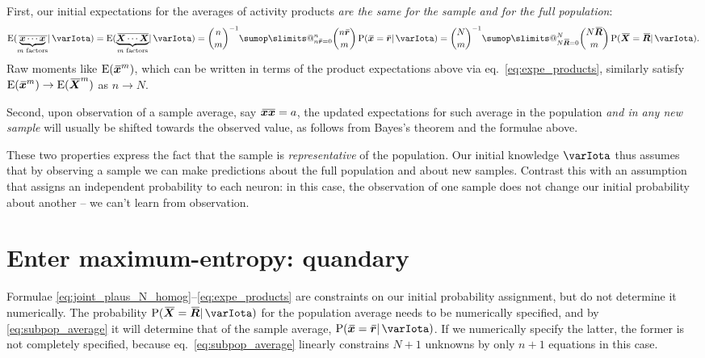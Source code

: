\documentclass{article}
\makeatletter
\theoremstyle{remark}
\theoremstyle{innote}
\def\sum{\DOTSI\sumop\slimits@}
\renewcommand*{\|}{\mathpunct{|}}%
\newcommand*{\p}{\mathrm{P}}%
\newcommand*{\eqn}{eq.}%
\newcommand*{\E}{\mathrm{E}}
\DeclarePairedDelimiter\expp{(}{)}
\newcommand*{\expe}{\E\expp}%
\theoremstyle{simple}
\newcommand*{\widebar}[1]{{\mkern1.5mu\skew{2}\overline{\mkern-1.5mu#1\mkern-1.5mu}\mkern 1.5mu}}
\newcommand*{\av}{\widebar} %
\newcommand*{\sav}{\widebar} %
\newcommand*{\yxx}{x}%
\newcommand*{\yx}{\bm{\yxx}}%
\newcommand*{\yxs}{\sav{\yx}}%
\newcommand*{\yX}{\bm{X}}%
\newcommand*{\yXf}{\av{\yX}}%
\newcommand*{\yxxs}{\sav{\yx\yx}}%
\newcommand*{\yr}{\bm{r}}%
\newcommand*{\yrs}{\sav{\yr}}%
\newcommand*{\yR}{\bm{R}}%
\newcommand*{\yRf}{\av{\yR}}%
\newcommand*{\yH}{\varIota}
\makeatother
\begin{document}
First, our initial expectations for the averages of activity products
\emph{are the same for the sample and for the full population}:
\begin{equation}
  \label{eq:expe_products}
\expe{\sav{\underbrace{\yx \dotsm \yx}_{\text{$m$ factors}}} \| \yH}
=
\expe{\av{\underbrace{\yX \dotsm \yX}_{\text{$m$ factors}}} \| \yH}
=
\binom{n}{m}^{-1}
\sum_{n \yrs=0}^n %
\binom{n \yrs}{m}\, \p(\yxs=\yrs \| \yH)
=
\binom{N}{m}^{-1}
\sum_{N \yRf=0}^N %
\binom{N \yRf}{m}\, \p(\yXf=\yRf \| \yH).
\end{equation}
Raw moments like $\expe{\yxs^m}$, which can be written in terms of the
product expectations above via \eqn~\eqref{eq:expe_products}, similarly
satisfy $\expe{\yxs^m} \to \expe{\yXf^m}$ as $n \to N$.

Second, upon observation of a sample average, say $\yxxs=a$, the updated
expectations for such average in the population \emph{and in any new
  sample} will usually be shifted towards the observed value, as follows
from Bayes's theorem and the formulae above.

These two properties express the fact that the sample is
\emph{representative} of the population. Our initial knowledge $\yH$ thus
assumes that by observing a sample we can make predictions about the full
population and about new samples. Contrast this with an assumption that
assigns an independent probability to each neuron: in this case, the
observation of one sample does not change our initial probability about
another -- we can't learn from observation.

\section{Enter maximum-entropy: quandary}
\label{sec:specific_initial_probability}

Formulae \eqref{eq:joint_plaus_N_homog}--\eqref{eq:expe_products} are
constraints on our initial probability assignment, but do not determine it
numerically. The probability $\p(\yXf=\yRf \| \yH)$ for the population
average needs to be numerically specified, and by \eqref{eq:subpop_average}
it will determine that of the sample average, $\p(\yxs=\yrs \| \yH)$. If we
numerically specify the latter, the former is not completely specified,
because \eqn~\eqref{eq:subpop_average} linearly constrains $N+1$ unknowns
by only $n+1$ equations in this case.
\end{document}
